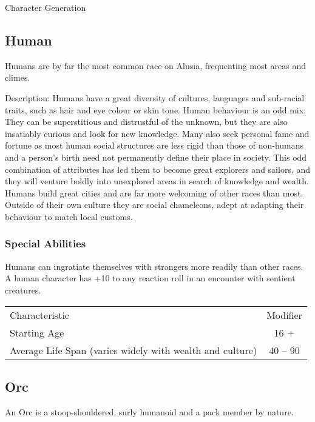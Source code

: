 \begin{Chapter}{Character Generation}
\subsection{Human}

Humans are by far the most common race on Alusia, frequenting most
areas and climes.

Description: Humans have a great diversity of cultures, languages and
sub-racial traits, such as hair and eye colour or skin tone. Human
behaviour is an odd mix.  They can be superstitious and distrustful of
the unknown, but they are also insatiably curious and look for new
knowledge.  Many also seek personal fame and fortune as most human
social structures are less rigid than those of non-humans and a
person’s birth need not permanently define their place in society.
This odd combination of attributes has led them to become great
explorers and sailors, and they will venture boldly into unexplored
areas in search of knowledge and wealth. Humans build great cities and
are far more welcoming of other races than most.  Outside of their own
culture they are social chameleons, adept at adapting their behaviour
to match local customs.

\subsubsection{Special Abilities}

\begin{Enumerate}

\item Humans can ingratiate themselves with strangers more readily
  than other races.  A human character has +10 to any reaction roll in
  an encounter with sentient creatures.

\end{Enumerate}

\begin{tabularx}{\columnwidth}{Xc}
Characteristic				& Modifier \\
Starting Age				& 16 + \\
Average Life Span (varies widely with wealth and culture) & 40 -- 90 \\
\end{tabularx}

\subsection{Orc}

An Orc is a stoop-shouldered, surly humanoid and a pack member by
nature.


\end{Chapter}
